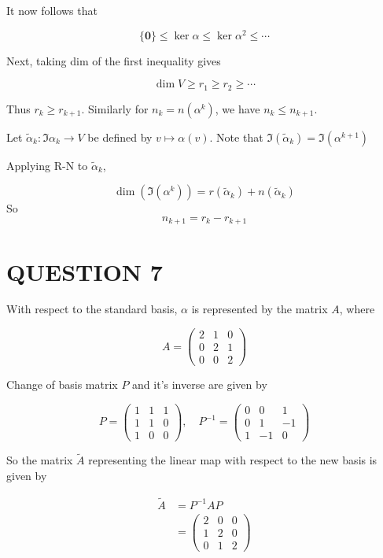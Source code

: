\documentclass[a4paper]{article}
\begin{document}
It now follows that

\[ \{ \mathbf{0} \} \leq \ker \alpha \leq \ker \alpha^{2} \leq \cdots \]

Next, taking dim of the first inequality gives

\[ \dim V \geq r_{1} \geq r_{2} \geq \cdots  \]
	
Thus $ r_{k} \geq r_{k+1} $. Similarly for $ n_{k} = n(\alpha^{k}) $, we have $ n_{k} \leq n_{k+1} $.

Let $ \widetilde{\alpha}_{k} : \Im \alpha_{k} \to V $ be defined by $ v \mapsto \alpha(v) $. Note that $ \Im(\widetilde{\alpha}_{k}) = \Im(\alpha^{k+1}) $

Applying R-N to $ \widetilde{\alpha}_{k} $,

\[ \dim (\Im(\alpha^{k})) = r(\widetilde{\alpha}_{k}) + n(\widetilde{\alpha}_{k}) \]
So
\[ n_{k+1} = r_{k} - r_{k+1} \]




\section{QUESTION 7}

With respect to the standard basis, $ \alpha $ is represented by the matrix $ A $, where

\[ A =  \begin{pmatrix}
2 & 1 & 0\\
0 & 2 & 1\\
0 & 0 & 2
\end{pmatrix} \]

Change of basis matrix $ P $ and it's inverse are given by

\[ P = \begin{pmatrix}
1 & 1 & 1 \\
1 & 1 & 0\\
1 & 0 & 0
\end{pmatrix}, \quad P^{-1} = \begin{pmatrix}
0 & 0 & 1 \\
0 & 1 & -1 \\
1 & -1 & 0
\end{pmatrix} \]

So the matrix $ \tilde{A} $ representing the linear map with respect to the new basis is given by

\begin{align*}
\tilde{A}  & =  P^{-1} A P \\
& = \begin{pmatrix}
2 & 0 & 0\\
1 & 2 & 0 \\
0 & 1 & 2
\end{pmatrix}
\end{align*}
\end{document}

